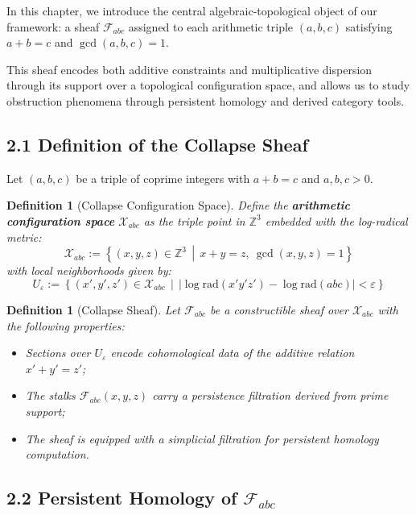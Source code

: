 \documentclass[11pt]{article}
\newtheorem{definition}[theorem]{Definition}
\begin{document}
In this chapter, we introduce the central algebraic-topological object of our framework:  
a sheaf $\mathcal{F}_{abc}$ assigned to each arithmetic triple $(a, b, c)$ satisfying $a + b = c$ and $\gcd(a,b,c) = 1$.

This sheaf encodes both additive constraints and multiplicative dispersion through its support over a topological configuration space, and allows us to study obstruction phenomena through persistent homology and derived category tools.

\subsection{2.1 Definition of the Collapse Sheaf}

Let $(a,b,c)$ be a triple of coprime integers with $a + b = c$ and $a,b,c > 0$.

\begin{definition}[Collapse Configuration Space]
Define the \textbf{arithmetic configuration space} $\mathcal{X}_{abc}$ as the triple point in $\mathbb{Z}^3$ embedded with the log-radical metric:
\[
\mathcal{X}_{abc} := \left\{ (x,y,z) \in \mathbb{Z}^3 \,\middle|\, x+y = z,\ \gcd(x,y,z)=1 \right\}
\]
with local neighborhoods given by:
\[
U_\varepsilon := \left\{ (x',y',z') \in \mathcal{X}_{abc} \,\middle|\, \left| \log \mathrm{rad}(x'y'z') - \log \mathrm{rad}(abc) \right| < \varepsilon \right\}
\]
\end{definition}

\begin{definition}[Collapse Sheaf]
Let $\mathcal{F}_{abc}$ be a constructible sheaf over $\mathcal{X}_{abc}$ with the following properties:
\begin{itemize}
    \item Sections over $U_\varepsilon$ encode cohomological data of the additive relation $x'+y'=z'$;
    \item The stalks $\mathcal{F}_{abc}(x,y,z)$ carry a persistence filtration derived from prime support;
    \item The sheaf is equipped with a simplicial filtration for persistent homology computation.
\end{itemize}
\end{definition}

\subsection{2.2 Persistent Homology of $\mathcal{F}_{abc}$}
\end{document}
